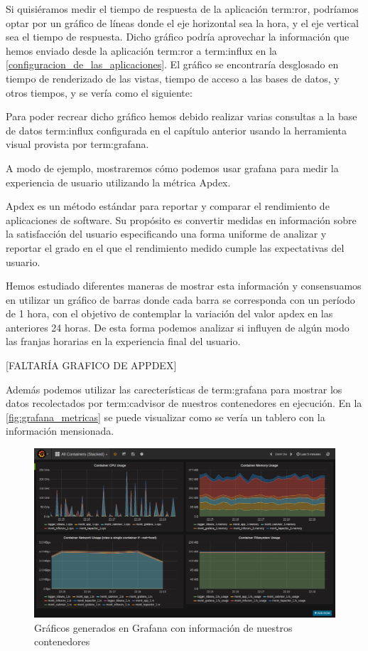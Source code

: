 Si quisiéramos medir el tiempo de respuesta de la aplicación \gls{term:ror},
podríamos optar por un gráfico de líneas donde el eje horizontal sea la hora, y
el eje vertical sea el tiempo de respuesta. Dicho gráfico podría aprovechar la
información que hemos enviado desde la aplicación \gls{term:ror} a
\gls{term:influx} en la \autoref{configuracion_de_las_aplicaciones}. El gráfico
se encontraría desglosado en tiempo de renderizado de las vistas, tiempo de
acceso a las bases de datos, y otros tiempos, y se vería como el siguiente:

Para poder recrear dicho gráfico hemos debido realizar varias consultas a la
base de datos \gls{term:influx} configurada en el capítulo anterior usando la
herramienta visual provista por \gls{term:grafana}.

A modo de ejemplo, mostraremos cómo podemos usar grafana para medir la
experiencia de usuario utilizando la métrica Apdex.

Apdex es un método estándar para reportar y comparar el rendimiento de
aplicaciones de software. Su propósito es convertir medidas en información
sobre la satisfacción del usuario especificando una forma uniforme de analizar
y reportar el grado en el que el rendimiento medido cumple las expectativas del
usuario.

Hemos estudiado diferentes maneras de mostrar esta información y consensuamos
en utilizar un gráfico de barras donde cada barra se corresponda con un período
de 1 hora, con el objetivo de contemplar la variación del valor apdex en las
anteriores 24 horas. De esta forma podemos analizar si influyen de algún modo
las franjas horarias en la experiencia final del usuario.

[FALTARÍA GRAFICO DE APPDEX]

Además podemos utilizar las carecterísticas de \gls{term:grafana} para mostrar
los datos recolectados por \gls{term:cadvisor} de nuestros contenedores en
ejecución. En la \autoref{fig:grafana_metricas} se puede visualizar como se
vería un tablero con la información mensionada.

\begin{figure}
  \includegraphics[width=\linewidth]{src/images/05-capitulo-5/grafana_metricas.png}
  \caption{Gráficos generados en Grafana con información de nuestros contenedores}
  \label{fig:grafana_metricas}
\end{figure}

